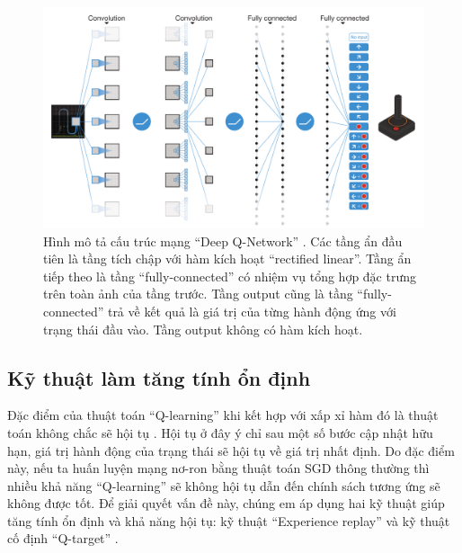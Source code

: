 	\begin{figure}
		\centering
		\includegraphics[width=\textwidth]{dqn}
		\caption[Cấu trúc mạng ``Deep Q-Network'']{Hình mô tả cấu trúc mạng ``Deep Q-Network'' \cite{mnihdqn2015}.
		Các tầng ẩn đầu tiên là tầng tích chập với hàm kích hoạt ``rectified linear''.
		Tầng ẩn tiếp theo là tầng ``fully-connected'' có nhiệm vụ tổng hợp đặc trưng trên toàn ảnh của tầng trước.
		Tầng output cũng là tầng ``fully-connected'' trả về kết quả là giá trị của từng hành động ứng với trạng thái đầu vào.
		Tầng output không có hàm kích hoạt.}
		\label{fig_dqn_nature}
	\end{figure}

\subsection{Kỹ thuật làm tăng tính ổn định}
	Đặc điểm của thuật toán ``Q-learning'' khi kết hợp với xấp xỉ hàm đó là thuật toán không chắc sẽ hội tụ \cite{sutton1998introduction}.
	Hội tụ ở đây ý chỉ sau một số bước cập nhật hữu hạn, giá trị hành động của trạng thái sẽ hội tụ về giá trị nhất định.
	Do đặc điểm này, nếu ta huấn luyện mạng nơ-ron bằng thuật toán SGD thông thường thì nhiều khả năng ``Q-learning'' sẽ không hội tụ dẫn đến chính sách tương ứng sẽ không được tốt.
	Để giải quyết vấn đề này, chúng em áp dụng hai kỹ thuật giúp tăng tính ổn định và khả năng hội tụ: kỹ thuật ``Experience replay'' và kỹ thuật cố định ``Q-target'' \cite{mnih2013playing}.
	
